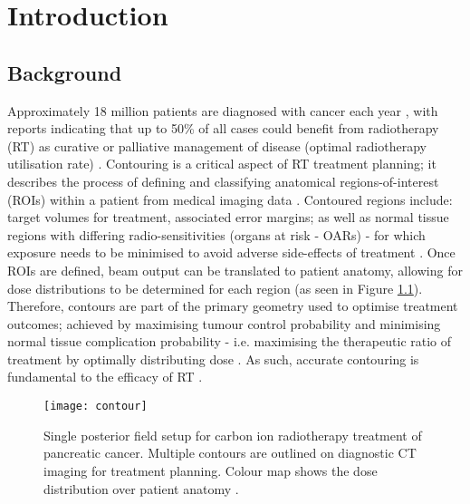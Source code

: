 \chapter{Introduction} \label{ch:introduction}

\section{Background}
Approximately 18 million patients are diagnosed with cancer each year \cite{Bray2019}, with reports indicating that up to 50\% of all cases could benefit from radiotherapy (RT) as curative or palliative management of disease (optimal radiotherapy utilisation rate) \cite{Barton2014}. Contouring is a critical aspect of RT treatment planning; it describes the process of defining and classifying anatomical regions-of-interest (ROIs) within a patient from medical imaging data \cite{CITATION}. Contoured regions include: target volumes for treatment, associated error margins; as well as normal tissue regions with differing radio-sensitivities (organs at risk - OARs) - for which exposure needs to be minimised to avoid adverse side-effects of treatment \cite{CITATION}. Once ROIs are defined, beam output can be translated to patient anatomy, allowing for dose distributions to be determined for each region (as seen in Figure \ref{fig:contour}). Therefore, contours are part of the primary geometry used to optimise treatment outcomes; achieved by maximising tumour control probability and minimising normal tissue complication probability - i.e. maximising the therapeutic ratio of treatment by optimally distributing dose \cite{CITATION}. As such, accurate contouring is fundamental to the efficacy of RT \cite{CITATION}.

\begin{figure}[!htb]
	\begin{center}
		\texttt{[image: contour]}
		\caption{Single posterior field setup for carbon ion radiotherapy treatment of pancreatic cancer. Multiple contours are outlined on diagnostic CT imaging for treatment planning. Colour map shows the dose distribution over patient anatomy \cite{Dreher2017}.}
		\label{fig:contour}
	\end{center}
\end{figure}


